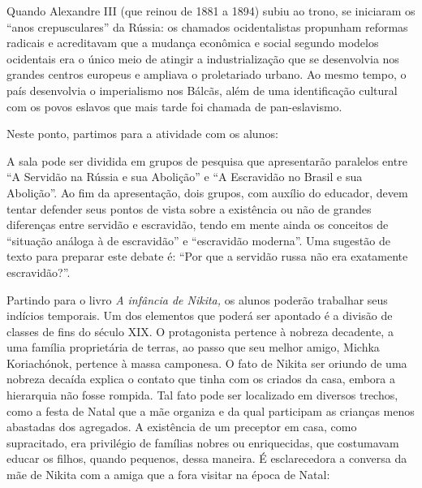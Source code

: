 \documentclass{article}
\begin{document}
\reversemarginpar
\marginparwidth=5cm


Quando Alexandre III (que reinou de 1881 a 1894) subiu ao trono, se
iniciaram os ``anos crepusculares'' da Rússia: os chamados
ocidentalistas propunham reformas radicais e acreditavam que a mudança
econômica e social segundo modelos ocidentais era o único meio de
atingir a industrialização que se desenvolvia nos grandes centros
europeus e ampliava o proletariado urbano. Ao mesmo tempo, o país
desenvolvia o imperialismo nos Bálcãs, além de uma identificação
cultural com os povos eslavos que mais tarde foi chamada de
pan-eslavismo.

Neste ponto, partimos para a atividade com os alunos:

A sala pode ser dividida em grupos de pesquisa que apresentarão
paralelos entre ``A Servidão na Rússia e sua Abolição'' e ``A Escravidão
no Brasil e sua Abolição''. Ao fim da apresentação, dois grupos, com
auxílio do educador, devem tentar defender seus pontos de vista sobre a
existência ou não de grandes diferenças entre servidão e escravidão,
tendo em mente ainda os conceitos de ``situação análoga à de
escravidão'' e ``escravidão moderna''. Uma sugestão de texto para
preparar este debate é: ``Por que a servidão russa não era exatamente
escravidão?''.


Partindo para o livro \emph{A infância de Nikita,} os alunos poderão
trabalhar seus indícios temporais. Um dos elementos que poderá ser
apontado é a divisão de classes de fins do século XIX. O protagonista
pertence à nobreza decadente, a uma família proprietária de terras, ao
passo que seu melhor amigo, Michka Koriachónok, pertence à massa
camponesa. O fato de Nikita ser oriundo de uma nobreza decaída explica o
contato que tinha com os criados da casa, embora a hierarquia não fosse
rompida. Tal fato pode ser localizado em diversos trechos, como a festa
de Natal que a mãe organiza e da qual participam as crianças menos
abastadas dos agregados. A existência de um preceptor em casa, como
supracitado, era privilégio de famílias nobres ou enriquecidas, que
costumavam educar os filhos, quando pequenos, dessa maneira. É
esclarecedora a conversa da mãe de Nikita com a amiga que a fora visitar
na época de Natal:
\end{document}
